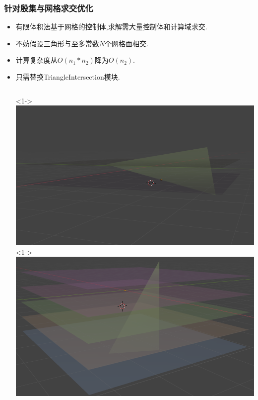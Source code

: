 \documentclass[UTF8]{ctexbeamer}	%
\theoremstyle{plain}
\theoremstyle{definition}
\theoremstyle{remark}
\numberwithin{equation}{section}
\begin{document}
\begin{frame}
    \frametitle{针对殷集与网格求交优化}
    \begin{itemize}
        \item 有限体积法基于网格的控制体,求解需大量控制体和计算域求交.
        \item 不妨假设三角形与至多常数$N$个网格面相交.
        \item 计算复杂度从$O(n_1 * n_2)$降为$O(n_2)$.
        \item 只需替换TriangleIntersection模块.
        \vspace{0.2in}
         \begin{columns}
        <1->
        \includegraphics[width = \textwidth]{fig/sw.png}
        <1->
        \includegraphics[width = \textwidth]{fig/sw2.png}
    \end{columns}
    \end{itemize}
\end{frame}
\end{document}
